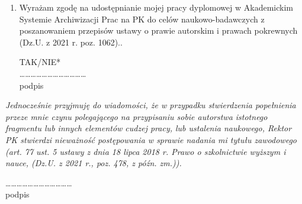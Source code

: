 \begin{small}
\begin{enumerate}
\item Wyrażam zgodę na udostępnianie mojej pracy dyplomowej w Akademickim Systemie Archiwizacji Prac na PK do celów naukowo-badawczych z poszanowaniem przepisów ustawy o prawie autorskim i prawach pokrewnych (Dz.U. z 2021 r. poz. 1062)..

 
\begin{flushright}
TAK/NIE* \\
………………………………\\
podpis
\end{flushright}

\end{enumerate}
\textit{Jednocześnie przyjmuję do wiadomości, że w przypadku stwierdzenia popełnienia przeze mnie czynu polegającego na przypisaniu sobie autorstwa istotnego fragmentu lub innych elementów cudzej pracy, lub ustalenia naukowego, Rektor PK stwierdzi nieważność postępowania w sprawie nadania mi tytułu zawodowego (art. 77 ust. 5 ustawy z dnia 18 lipca 2018 r. Prawo o szkolnictwie wyższym i nauce, (Dz.U. z 2021 r., poz. 478, z późn. zm.)).}

\begin{flushright}
……………………………… \\
podpis
\end{flushright}
\end{small}

\endgroup